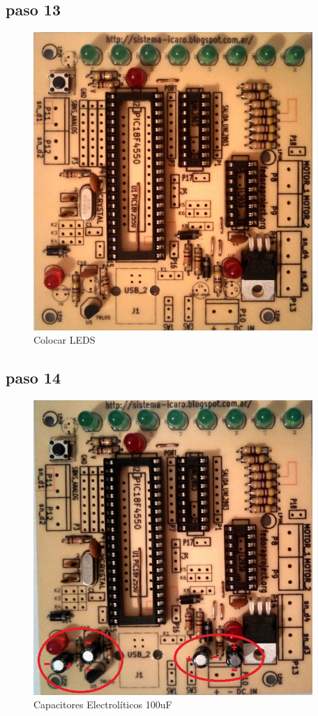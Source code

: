 \documentclass[letterpaper,10pt,english]{sphinxmanual}
\begin{document}
\subsection{paso 13}
\label{np07:paso-13}\begin{figure}[htbp]
\centering
\capstart

\includegraphics[width=300pt]{13b.jpg}
\caption{Colocar LEDS}\end{figure}
\newpage

\subsection{paso 14}
\label{np07:paso-14}\begin{figure}[htbp]
\centering
\capstart

\includegraphics[width=300pt]{14b.jpg}
\caption{Capacitores Electrolíticos 100uF}\end{figure}
\newpage
\end{document}
